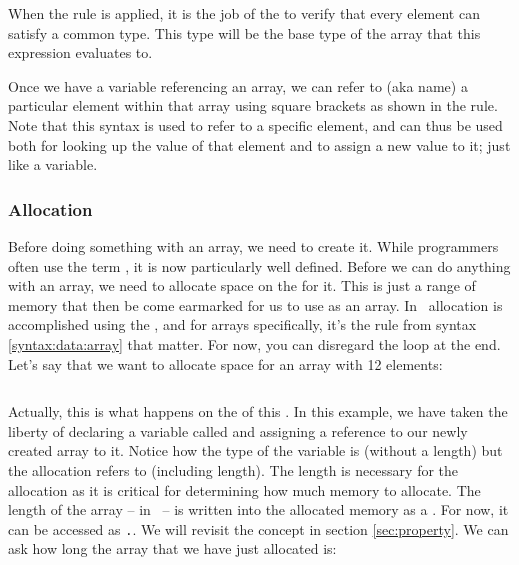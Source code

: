 \begin{syntaxfloat}
  
  \caption{Arrays}
  \label{syntax:data:array}
\end{syntaxfloat}

When the  rule is applied, it is the job of the  to verify that every element can satisfy a common type. This type will be the base type of the array that this expression evaluates to.

Once we have a variable referencing an array, we can refer to (aka name) a particular element within that array using square brackets as shown in the  rule. Note that this syntax is used to refer to a specific element, and can thus be used both for looking up the value of that element and to assign a new value to it; just like a variable.

\subsubsection{Allocation}

Before doing something with an array, we need to create it. While programmers often use the term , it is now particularly well defined. Before we can do anything with an array, we need to allocate space on the  for it. This is just a range of memory  that then be come earmarked for us to use as an array. In \csharp\ allocation is accomplished using the , and for arrays specifically, it's the  rule from syntax \ref{syntax:data:array} that matter. For now, you can disregard the loop at the end. Let's say that we want to allocate space for an array with 12  elements:

\inputminted[lastline=1]{csharp}{../src/csharp/primdata/array_alloc/Program.cs}

Actually, this is what happens on the  of this . In this example, we have taken the liberty of declaring a variable called  and assigning a reference to our newly created array to it. Notice how the type of the variable is  (without a length) but the allocation refers to  (including length). The length is necessary for the allocation as it is critical for determining how much memory to allocate. The length of the array -- in \csharp\ -- is written into the allocated memory as a . For now, it can be accessed as \texttt{.}. We will revisit the concept in section \ref{sec:property}. We can ask how long the array that we have just allocated is:

